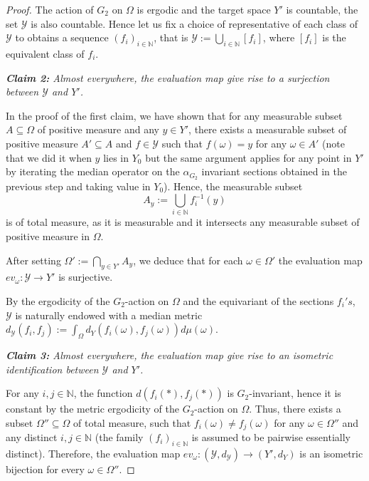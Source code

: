 \documentclass{amsart}
\numberwithin{equation}{section}
\newcommand{\YY}{\mathcal{Y}}     %
\newcommand{\NN}{\mathbb{N}}      %
\theoremstyle{definition}
\begin{document}
\begin{proof}
 \par
 The action of $G_2$ on $\Omega$ is ergodic and the target space $Y'$ is countable, the set $\YY$ is also countable. Hence let us fix a choice of representative of each class of $\YY$ to obtains a sequence $(f_i)_{i\in\NN}$, that is $\YY:=\displaystyle{\bigcup_{i\in\NN}[f_i]}$, where $[f_i]$ is the equivalent class of $f_i$.\par 
  \textit{\textbf{Claim 2:} Almost everywhere, the evaluation map give rise to a surjection between $\YY$ and $Y'$.}\par
  In the proof of the first claim, we have shown that for any measurable subset $A\subseteq \Omega$ of positive measure and any $y\in Y'$, there exists a measurable subset of positive measure $A'\subseteq A$ and $f\in \YY$ such that $f(\omega)=y$ for any $\omega\in A'$ (note that we did it when $y$ lies in $Y_0$ but the same argument applies for any point in $Y'$ by iterating the median operator on the $\alpha_{G_2}$ invariant sections obtained in the previous step and taking value in $Y_0$). Hence, the measurable subset 
  \[
  A_y:=\bigcup_{i\in\NN}f_i^{-1}(y)
  \]
 is of total measure, as it is measurable and it intersects any measurable subset of positive measure in $\Omega$.\par 
 After setting $\Omega':=\displaystyle{\bigcap_{y\in Y'}A_y}$, we deduce that for each $\omega\in \Omega'$ the evaluation map $ev_\omega:\YY\rightarrow Y'$ is surjective.\par 
 By the ergodicity of the $G_2$-action on $\Omega$ and the equivariant of the sections $f_i's$, $\YY$ is naturally endowed with a median metric $d_\YY(f_i,f_j):=\int_{\Omega}d_Y(f_i(\omega),f_j(\omega))d\mu(\omega)$. \par 
 
\textit{\textbf{Claim 3:} Almost everywhere, the evaluation map give rise to an isometric identification between $\YY$ and $Y'$.}\par 
For any $i,j\in\NN$, the function $d(f_i(*),f_j(*))$ is $G_2$-invariant, hence it is constant by the metric ergodicity of the $G_2$-action on $\Omega$. Thus, there exists a subset $\Omega''\subseteq \Omega$ of total measure, such that $f_i(\omega)\neq f_j(\omega)$ for any $\omega\in\Omega''$ and any distinct $i,j\in\NN$ (the family $(f_i)_{i\in\NN}$ is assumed to be pairwise essentially distinct). Therefore, the evaluation map $ev_\omega:(\YY,d_\YY)\rightarrow (Y',d_Y)$ is an isometric bijection for every $\omega\in \Omega''$.\par 


\end{proof}
\end{document}
